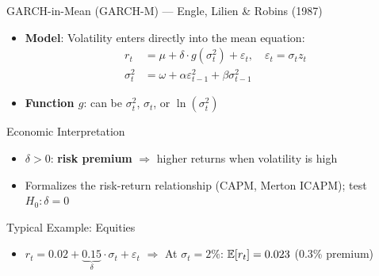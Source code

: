 \documentclass[9pt, aspectratio=169, t]{beamer}
\begin{document}
\begin{frame}{GARCH-in-Mean (GARCH-M) --- Engle, Lilien \& Robins (1987)}
    \vspace{-0.2cm}
\small
    \begin{defn}[GARCH-M]
        \begin{itemize}\setlength{\itemsep}{0pt}
            \item \textbf{Model}: Volatility enters directly into the mean equation:
            \vspace{-0.2cm}
            \begin{align*}
                r_t &= \mu + \delta \cdot g(\sigma_t^2) + \varepsilon_t, \quad \varepsilon_t = \sigma_t z_t \\
                \sigma_t^2 &= \omega + \alpha \varepsilon_{t-1}^2 + \beta \sigma_{t-1}^2
            \end{align*}
            \vspace{-0.4cm}
            \item \textbf{Function $g$}: can be $\sigma_t^2$, $\sigma_t$, or $\ln(\sigma_t^2)$
        \end{itemize}
    \end{defn}
    \vspace{-0.2cm}
    {\footnotesize
    \begin{block}{Economic Interpretation}
        \begin{itemize}\setlength{\itemsep}{0pt}
            \item $\delta > 0$: \textbf{risk premium} $\Rightarrow$ higher returns when volatility is high
            \item Formalizes the risk-return relationship (CAPM, Merton ICAPM); test $H_0: \delta = 0$
        \end{itemize}
    \end{block}
    \vspace{-0.1cm}
    \begin{exampleblock}{Typical Example: Equities}
        \begin{itemize}\setlength{\itemsep}{0pt}
            \item $r_t = 0.02 + \underbrace{0.15}_{\delta} \cdot \sigma_t + \varepsilon_t$ \quad $\Rightarrow$ At $\sigma_t = 2\%$: $\mathbb{E}[r_t] = 0.023$ (0.3\% premium)
        \end{itemize}
    \end{exampleblock}
    }
\end{frame}
\end{document}
